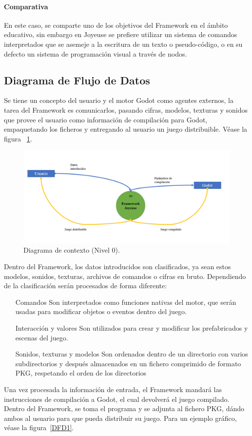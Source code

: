 \documentclass[]{article}
\begin{document}
\paragraph{Comparativa}
En este caso, se comparte uno de los objetivos del Framework en el \'ambito educativo, sin embargo en Joyeuse se prefiere utilizar un sistema de comandos interpretados que se asemeje a la escritura de un texto o pseudo-c\'odigo, o en su defecto un sistema de programaci\'on visual a trav\'es de nodos. 

\subsection{Diagrama de Flujo de Datos}

Se tiene un concepto del usuario y el motor Godot como agentes externos, la tarea del Framework es comunicarlos, pasando cifras, modelos, texturas y sonidos que provee el usuario como informaci\'on de compilaci\'on para Godot, empaquetando los ficheros y entregando al usuario un juego distribuible. V\'ease la figura ~\ref{DFD0}. 

\begin{figure}[H]
	
	\centering
	\includegraphics[width=1\textwidth]{DFD}
	\caption{Diagrama de contexto (Nivel 0).} 
	\label{DFD0}
	
\end{figure}

Dentro del Framework, los datos introducidos son clasificados, ya sean estos modelos, sonidos, texturas, archivos de comandos o cifras en bruto. Dependiendo de la clasificaci\'on ser\'an procesados de forma diferente: 
\begin{itemize}
	\item[Comandos] Son interpretados como funciones nativas del motor, que ser\'an usadas para modificar objetos o eventos dentro del juego. 
	\item[Interacci\'on y valores] Son utilizados para crear y modificar los prefabricados y escenas del juego. 
	\item[Sonidos, texturas y modelos] Son ordenados dentro de un directorio con varios subdirectorios y despu\'es almacenados en un fichero comprimido de formato PKG, respetando el orden de los directorios
\end{itemize}
Una vez procesada la informaci\'on de entrada, el Framework mandar\'a las instrucciones de compilaci\'on a Godot, el cual devolver\'a el juego compilado. 
Dentro del Framework, se toma el programa y se adjunta al fichero PKG, d\'ando ambos al usuario para que pueda distribuir su juego. Para un ejemplo gr\'afico, v\'ease la figura~\ref{DFD1}.
\end{document}
